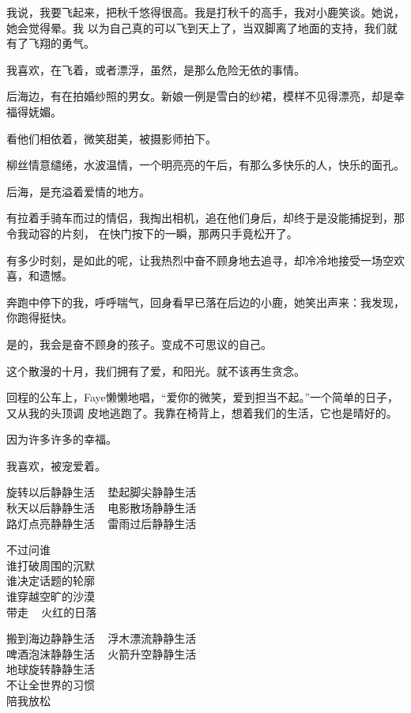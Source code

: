 		我说，我要飞起来，把秋千悠得很高。我是打秋千的高手，我对小鹿笑谈。她说，她会觉得晕。我
	以为自己真的可以飞到天上了，当双脚离了地面的支持，我们就有了飞翔的勇气。

		我喜欢，在飞着，或者漂浮，虽然，是那么危险无依的事情。


		后海边，有在拍婚纱照的男女。新娘一例是雪白的纱裙，模样不见得漂亮，却是幸福得妩媚。

		看他们相依着，微笑甜美，被摄影师拍下。

		柳丝情意缱绻，水波温情，一个明亮亮的午后，有那么多快乐的人，快乐的面孔。

		后海，是充溢着爱情的地方。

		有拉着手骑车而过的情侣，我掏出相机，追在他们身后，却终于是没能捕捉到，那令我动容的片刻，
	在快门按下的一瞬，那两只手竟松开了。

		有多少时刻，是如此的呢，让我热烈中奋不顾身地去追寻，却冷冷地接受一场空欢喜，和遗憾。

		奔跑中停下的我，呼呼喘气，回身看早已落在后边的小鹿，她笑出声来：我发现，你跑得挺快。

		是的，我会是奋不顾身的孩子。变成不可思议的自己。


		这个散漫的十月，我们拥有了爱，和阳光。就不该再生贪念。

		回程的公车上，Faye懒懒地唱，“爱你的微笑，爱到担当不起。”一个简单的日子，又从我的头顶调
	皮地逃跑了。我靠在椅背上，想着我们的生活，它也是晴好的。


		因为许多许多的幸福。

		我喜欢，被宠爱着。

	\endwriting



		\longpoem{}{}{} \centering
			旋转以后静静生活 ~ 垫起脚尖静静生活 \\
			秋天以后静静生活 ~ 电影散场静静生活 \\
			路灯点亮静静生活 ~ 雷雨过后静静生活

			不过问谁 \\
			谁打破周围的沉默 \\
			谁决定话题的轮廓 \\
			谁穿越空旷的沙漠 \\
			带走 ~ 火红的日落

			搬到海边静静生活 ~ 浮木漂流静静生活 \\
			啤酒泡沫静静生活 ~ 火箭升空静静生活 \\
			地球旋转静静生活 \\
			不让全世界的习惯 \\
			陪我放松

